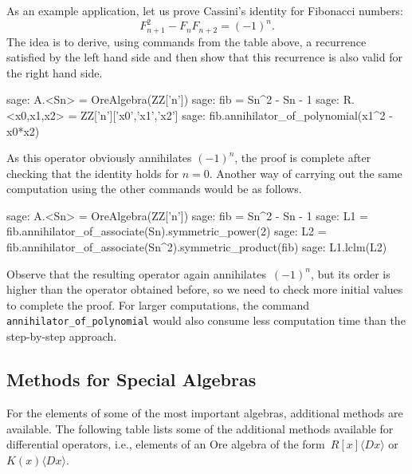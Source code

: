 \documentclass[11pt]{amsart}
\def\<#1>{\langle#1\rangle}
\begin{document}
As an example application, let us prove Cassini's identity for Fibonacci
numbers: 
\[
  F_{n+1}^2 - F_nF_{n+2}=(-1)^n.
\]
The idea is to derive, using commands
from the table above, a recurrence satisfied by the left hand side and then show
that this recurrence is also valid for the right hand side. 

\begin{sageexample}
  sage: A.<Sn> = OreAlgebra(ZZ['n'])
  sage: fib = Sn^2 - Sn - 1
  sage: R.<x0,x1,x2> = ZZ['n']['x0','x1','x2']
  sage: fib.annihilator_of_polynomial(x1^2 - x0*x2) 
\end{sageexample}

As this operator obviously annihilates $(-1)^n$, the proof is complete after
checking that the identity holds for $n=0$. Another way of carrying out the
same computation using the other commands would be as follows.

\begin{sageexample}
  sage: A.<Sn> = OreAlgebra(ZZ['n'])
  sage: fib = Sn^2 - Sn - 1
  sage: L1 = fib.annihilator_of_associate(Sn).symmetric_power(2)
  sage: L2 = fib.annihilator_of_associate(Sn^2).symmetric_product(fib)
  sage: L1.lclm(L2)
\end{sageexample}

Observe that the resulting operator again annihilates~$(-1)^n$, but its order is
higher than the operator obtained before, so we need to check more initial
values to complete the proof. For larger computations, the command
\verb|annihilator_of_polynomial| would also consume less computation time than
the step-by-step approach.

\subsection{Methods for Special Algebras}

For the elements of some of the most important algebras, additional methods are
available. The following table lists some of the additional methods available
for differential operators, i.e., elements of an Ore algebra of the
form~$R[x]\<Dx>$ or $K(x)\<Dx>$.
\end{document}
